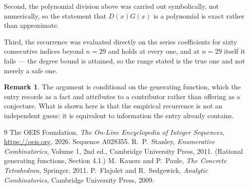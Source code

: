\documentclass[11pt,a4paper]{article}
\theoremstyle{plain}
\theoremstyle{definition}
\newtheorem{remark}[theorem]{Remark}
\begin{document}
Second, the polynomial division above was carried out symbolically, not numerically, so the
statement that $D(x)G(x)$ is a polynomial is exact rather than approximate.

Third, the recurrence was evaluated directly on the series coefficients for sixty consecutive
indices beyond $n=29$ and holds at every one, and at $n=29$ itself it fails --- the
degree bound is attained, so the range stated is the true one and not merely a safe one.

\begin{remark}
The argument is conditional on the generating function, which the entry records as a fact and
attributes to a contributor rather than offering as a conjecture. What is shown here is that
the empirical recurrence is not an independent guess: it is equivalent to information the
entry already contains.
\end{remark}

\begin{thebibliography}{9}
 The OEIS Foundation, \emph{The On-Line Encyclopedia of Integer
Sequences}, \url{https://oeis.org}, 2026. Sequence A028355.
 R.~P.~Stanley, \emph{Enumerative Combinatorics}, Volume 1, 2nd ed.,
Cambridge University Press, 2011. (Rational generating functions, Section 4.1.)
 M.~Kauers and P.~Paule, \emph{The Concrete Tetrahedron}, Springer, 2011.
 P.~Flajolet and R.~Sedgewick, \emph{Analytic Combinatorics}, Cambridge
University Press, 2009.
\end{thebibliography}
\end{document}

